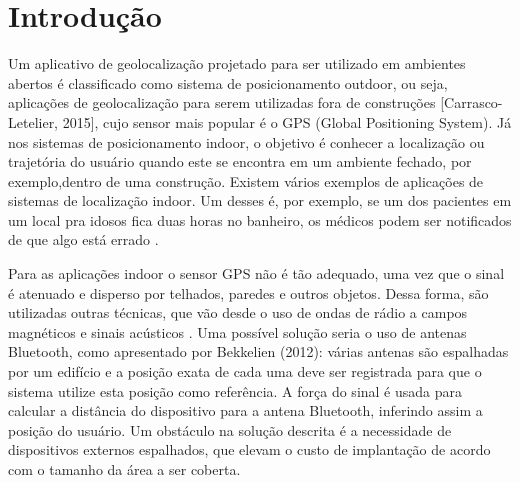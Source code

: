\chapter[Introdução]{Introdução}

Um aplicativo de geolocalização projetado para ser utilizado em ambientes abertos é classificado   como   sistema   de   posicionamento   outdoor,   ou   seja,   aplicações   de geolocalização para serem utilizadas fora de construções [Carrasco-Letelier, 2015], cujo sensor mais popular é o GPS (Global Positioning System). Já nos sistemas de posicionamento indoor, o objetivo é conhecer a localização ou trajetória do usuário quando este se encontra em um ambiente fechado, por exemplo,dentro   de   uma   construção. Existem   vários   exemplos   de   aplicações   de sistemas de localização indoor. Um desses é, por exemplo, se um dos pacientes em um local pra idosos fica duas horas no banheiro, os médicos podem ser notificados de que algo está errado \cite{silvasistema}.

Para as aplicações indoor o sensor GPS não é tão adequado, uma vez que o sinal é atenuado e disperso por telhados, paredes e outros objetos. Dessa forma, são utilizadas outras técnicas, que vão desde o uso de ondas de rádio a campos magnéticos e sinais acústicos \cite{curran2011evaluation}. Uma possível solução seria o uso de antenas Bluetooth, como apresentado por Bekkelien (2012): várias antenas são espalhadas por um edifício e a posição exata de cada uma deve ser registrada para que o sistema utilize esta posição como referência. A força do sinal é usada para calcular a distância do dispositivo para a antena   Bluetooth,   inferindo   assim   a   posição   do   usuário.   Um   obstáculo   na   solução descrita é a necessidade de dispositivos externos espalhados, que elevam o custo de implantação de acordo com o tamanho da área a ser coberta.

